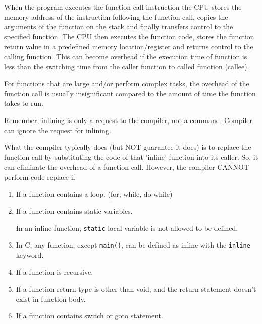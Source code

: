 \begin{mdframed}


When the program executes the function call instruction the CPU stores the
memory address of the instruction following the function call, copies the
arguments of the function on the stack and finally transfers control to the
specified function. The CPU then executes the function code, stores the function
return value in a predefined memory location/register and returns control to the
calling function. This can become overhead if the execution time of function is
less than the switching time from the caller function to called function
(callee).

For functions that are large and/or perform complex tasks, the overhead of the
function call is usually insignificant compared to the amount of time the
function takes to run.

Remember, inlining is only a request to the compiler, not a command. Compiler
can ignore the request for inlining.

\end{mdframed}

What the compiler  typically does (but NOT guarantee it does) 
is to replace the function call by substituting
the code of that 'inline' function into its caller. So, it can eliminate the
overhead of a function call. 
However, the compiler CANNOT perform code replace if
\begin{enumerate}
  \item If a function contains a loop. (for, while, do-while)
  
  \item  If a function contains static variables.

In an inline function,
\verb!static! local variable is not allowed to be defined. 

  \item In C, any function, except \verb!main()!, can be
defined as inline with the \verb!inline! keyword.

  \item If a function is recursive. 
  
  \item If a function return type is other than void, and the return statement doesn’t exist in function body.

  \item If a function contains switch or goto statement.
\end{enumerate}

